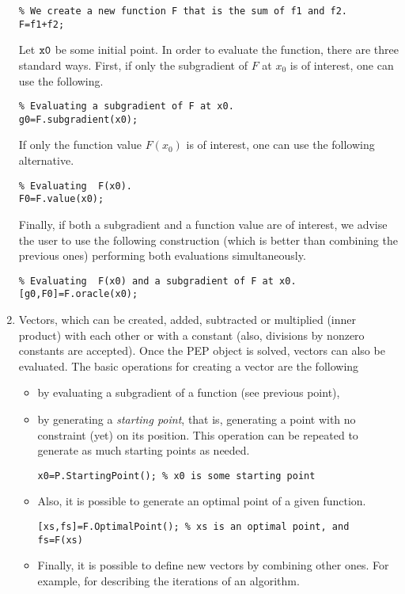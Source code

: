 \documentclass[11pt,a4paper]{article}
\begin{document}
\begin{enumerate}
\begin{lstlisting}
% We create a new function F that is the sum of f1 and f2.
F=f1+f2;
\end{lstlisting}
Let $\verb?x0?$ be some initial point. In order to evaluate the function, there are three standard ways. First, if only the subgradient of $F$ at $x_0$ is of interest, one can use the following.\\[-1cm]
\begin{lstlisting}
% Evaluating a subgradient of F at x0.
g0=F.subgradient(x0);
\end{lstlisting} If only the function value $F(x_0)$ is of interest, one can use the following alternative.\\[-1cm]
\begin{lstlisting}
% Evaluating  F(x0).
F0=F.value(x0);
\end{lstlisting} Finally, if both a subgradient and a function value are of interest, we advise the user to use the following construction (which is better than combining the previous ones) performing both evaluations simultaneously.\\[-1cm]
\begin{lstlisting}
% Evaluating  F(x0) and a subgradient of F at x0.
[g0,F0]=F.oracle(x0);
\end{lstlisting}
\item Vectors, which can be created, added, subtracted or multiplied (inner product) with each other or with a constant (also, divisions by nonzero constants are accepted). Once the PEP object is solved, vectors can also be evaluated. The basic operations for creating a vector are the following
\begin{itemize}
\item by evaluating a subgradient of a function (see previous point),
\item by generating a \emph{starting point}, that is, generating a point with no constraint (yet) on its position. This operation can be repeated to generate as much starting points as needed.\\[-1cm]
\begin{lstlisting}
x0=P.StartingPoint(); % x0 is some starting point
\end{lstlisting}
\item Also, it is possible to generate an optimal point of a given function.\\[-1cm]
\begin{lstlisting}
[xs,fs]=F.OptimalPoint(); % xs is an optimal point, and fs=F(xs)
\end{lstlisting}
\item Finally, it is possible to define new vectors by combining other ones. For example, for describing the iterations of an algorithm.\\[-1cm]

\end{itemize}
\end{enumerate}
\end{document}
